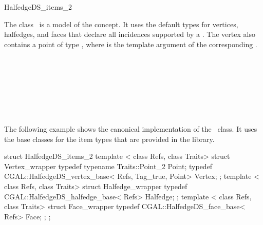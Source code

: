 
\ccRefPageBegin



\begin{ccRefClass}{HalfedgeDS_items_2}
\label{pageHalfedgeDSitemsRef}

\ccDefinition
  
The class \ccRefName\ is a model of the  concept.
It uses the default types for vertices, halfedges, and faces that
declare all incidences supported by a .  The vertex
also contains a point of type , where  
is the template argument of the corresponding .


\ccIsModel


\ccSeeAlso

\\
\\
\\
\\
\\
\\

\ccExample

The following example shows the canonical implementation of the
\ccRefName\ class. It uses the base classes for the item types that
are provided in the library.

\begin{ccExampleCode}
struct HalfedgeDS_items_2 {
    template < class Refs, class Traits>
    struct Vertex_wrapper {
        typedef typename Traits::Point_2 Point;
        typedef CGAL::HalfedgeDS_vertex_base< Refs, Tag_true, Point> Vertex;
    };
    template < class Refs, class Traits>
    struct Halfedge_wrapper {
        typedef CGAL::HalfedgeDS_halfedge_base< Refs> Halfedge;
    };
    template < class Refs, class Traits>
    struct Face_wrapper {
        typedef CGAL::HalfedgeDS_face_base< Refs> Face;
    };
};
\end{ccExampleCode}


\end{ccRefClass}
